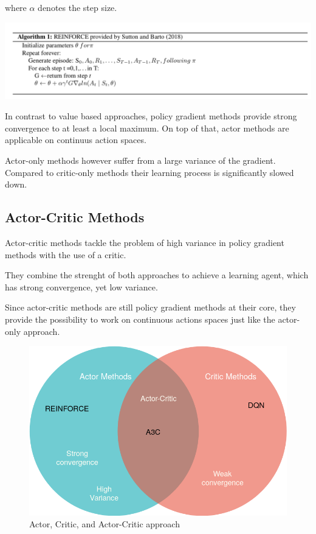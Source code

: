 where $\alpha$ denotes the step size.


\includegraphics[scale=0.4]{bilder/REINFORCE.png}


In contrast to value based approaches, policy gradient methods provide strong convergence to at least a local maximum.
On top of that, actor methods are applicable on continuus action spaces.
 \citep{Sutton00policygradient}
 
Actor-only methods however suffer from a large variance of the gradient. Compared to critic-only methods their learning process is significantly slowed down. \citep{Grondman12}
 

\subsection{Actor-Critic Methods}

Actor-critic methods tackle the problem of high variance in policy gradient methods with the use of a critic. 

They combine the strenght of both approaches to achieve a learning agent, which has strong convergence, yet low variance.

Since actor-critic methods are still policy gradient methods at their core, they provide the possibility to work on continuous actions spaces just like the actor-only approach.
\begin{figure}
\includegraphics[scale=0.5]{bilder/actorcritic1.png}
\caption{Actor, Critic, and Actor-Critic approach}
\end{figure}

